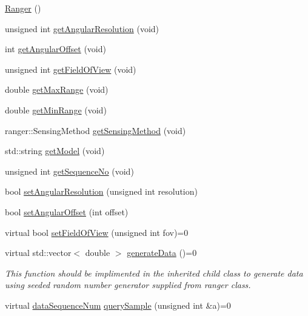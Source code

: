 \begin{DoxyCompactItemize}
\item 
\hyperlink{class_ranger_a65e1b9530f370b95cd673690c5bf02b5}{Ranger} ()
\item 
unsigned int \hyperlink{class_ranger_a95b5013ae191d1e19b93fab002306718}{get\+Angular\+Resolution} (void)
\item 
int \hyperlink{class_ranger_a1952b96d8dcbeb6afa107c8453d778a5}{get\+Angular\+Offset} (void)
\item 
unsigned int \hyperlink{class_ranger_a4bca7dce56b7959257d90b1f30bf0271}{get\+Field\+Of\+View} (void)
\item 
double \hyperlink{class_ranger_aba5e81260e55089d9ff869051156a722}{get\+Max\+Range} (void)
\item 
double \hyperlink{class_ranger_a646a06d3916179b9ebc4502bad169eec}{get\+Min\+Range} (void)
\item 
ranger\+::\+Sensing\+Method \hyperlink{class_ranger_a47e30b7ec55adec5bb542278ccfee140}{get\+Sensing\+Method} (void)
\item 
std\+::string \hyperlink{class_ranger_a00c1e787c323b1e1aa28333059fc4db5}{get\+Model} (void)
\item 
unsigned int \hyperlink{class_ranger_aff4dcbd8b1c63edfba7b474176860627}{get\+Sequence\+No} (void)
\item 
bool \hyperlink{class_ranger_a3dc62dcba54eefbd7a0f08cbf97d87dc}{set\+Angular\+Resolution} (unsigned int resolution)
\item 
bool \hyperlink{class_ranger_ae1b15546cf48d942f86ea1031e9be486}{set\+Angular\+Offset} (int offset)
\item 
virtual bool \hyperlink{class_ranger_a9cebe84c1aec338dc0b72baff48ea9d4}{set\+Field\+Of\+View} (unsigned int fov)=0
\item 
virtual std\+::vector$<$ double $>$ \hyperlink{class_ranger_a1ac4a84f251b0793fc262643080f084a}{generate\+Data} ()=0
\begin{DoxyCompactList}\small\item\em This function should be implimented in the inherited child class to generate data~\newline
 using seeded random number generator supplied from ranger class. \end{DoxyCompactList}\item 
virtual \hyperlink{struct_ranger_1_1data_sequence_num}{data\+Sequence\+Num} \hyperlink{class_ranger_adbde91455d069a471c890e2aa808c0d3}{query\+Sample} (unsigned int \&a)=0
\end{DoxyCompactItemize}
